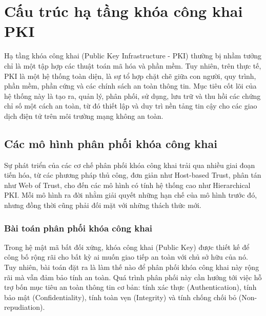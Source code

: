 \chapter{Cấu trúc hạ tầng khóa công khai PKI}
\label{chap:pki-arch}

Hạ tầng khóa công khai (Public Key Infrastructure - PKI) thường bị nhầm tưởng chỉ là một tập hợp các thuật toán mã hóa và phần mềm. Tuy nhiên, trên thực tế, PKI là một hệ thống toàn diện, là sự tổ hợp chặt chẽ giữa con người, quy trình, phần mềm, phần cứng và các chính sách an toàn thông tin. Mục tiêu cốt lõi của hệ thống này là tạo ra, quản lý, phân phối, sử dụng, lưu trữ và thu hồi các chứng chỉ số một cách an toàn, từ đó thiết lập và duy trì nền tảng tin cậy cho các giao dịch điện tử trên môi trường mạng không an toàn.


\section{Các mô hình phân phối khóa công khai}
\label{sec:3.1}
Sự phát triển của các cơ chế phân phối khóa công khai trải qua nhiều giai đoạn tiến hóa, từ các phương pháp thủ công, đơn giản như Host-based Trust, phân tán như Web of Trust, cho đến các mô hình có tính hệ thống cao như Hierarchical PKI. Mỗi mô hình ra đời nhằm giải quyết những hạn chế của mô hình trước đó, nhưng đồng thời cũng phải đối mặt với những thách thức mới.

\subsection{Bài toán phân phối khóa công khai}
Trong hệ mật mã bất đối xứng, khóa công khai (Public Key) được thiết kế để công bố rộng rãi cho bất kỳ ai muốn giao tiếp an toàn với chủ sở hữu của nó. Tuy nhiên, bài toán đặt ra là làm thế nào để phân phối khóa công khai này rộng rãi mà vẫn đảm bảo tính an toàn. Quá trình phân phối này cần hướng tới việc hỗ trợ bốn mục tiêu an toàn thông tin cơ bản: tính xác thực (Authentication), tính bảo mật (Confidentiality), tính toàn vẹn (Integrity) và tính chống chối bỏ (Non-repudiation).

